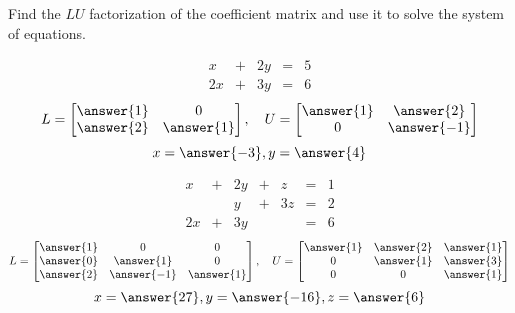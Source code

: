 \documentclass{ximera}
\begin{document}
\begin{problem}
Find the $LU$ factorization of the coefficient matrix and use it to solve the system of equations.
\begin{problem}\label{prob:LU2a}

$$
\begin{array}{ccccc}
      x& +&2y&=&5\\
      2x & +&3y&= &6 
    \end{array}
$$
$$L=\begin{bmatrix}\answer{1}&0\\\answer{2}&\answer{1}\end{bmatrix},\quad U=\begin{bmatrix}\answer{1}&\answer{2}\\0&\answer{-1}\end{bmatrix}$$
$$x=\answer{-3}, y=\answer{4}$$
\end{problem}

\begin{problem}\label{prob:LU2b}
$$\begin{array}{ccccccc}
      x & +&2y&+&z&= &1 \\
	 & &y&+&3z&=&2\\
     2x& +&3y&&&=&6
    \end{array}$$
    $$L=\begin{bmatrix}\answer{1}&0&0\\\answer{0}&\answer{1}&0\\\answer{2}&\answer{-1}&\answer{1}\end{bmatrix},\quad U=\begin{bmatrix} \answer{1}&\answer{2}&\answer{1}\\0&\answer{1}&\answer{3}\\0&0&\answer{1}\end{bmatrix}$$
    $$x=\answer{27},y=\answer{-16}, z=\answer{6}$$
\end{problem}

\end{problem}
\end{document}
